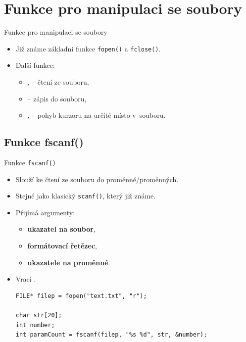 \documentclass[14pt,aspectratio=169]{beamer}
\begin{document}
    \section{Funkce pro manipulaci se soubory}
    \begin{frame}[t]{Funkce pro manipulaci se soubory}
        \begin{itemize}
            \item Již známe základní funkce \texttt{fopen()} a \texttt{fclose()}.
            \item Další funkce:
            \begin{itemize}
                \item \texttt{}, \texttt{} -- čtení ze souboru,
                \item \texttt{} -- zápis do souboru,
                \item \texttt{}, \texttt{} -- pohyb kurzoru na určité místo v~souboru.
            \end{itemize}
        \end{itemize}
    \end{frame}

    \subsection{Funkce fscanf()}
    \begin{frame}[t,fragile]{Funkce \texttt{fscanf()}}
        \begin{itemize}
            \item Slouží ke čtení ze souboru do proměnné/proměnných.
            \item Stejné jako klasický \texttt{scanf()}, který již známe. 
            \item Přijímá argumenty:
            \begin{itemize}
                \item \textbf{ukazatel na soubor},
                \item \textbf{formátovací řetězec},
                \item \textbf{ukazatele na proměnné}.
            \end{itemize}
            \item Vrací .
            \begin{lstlisting}
FILE* filep = fopen("text.txt", "r");

char str[20];
int number;
int paramCount = fscanf(filep, "%s %d", str, &number);
            \end{lstlisting}
        \end{itemize}
    \end{frame}
\end{document}
